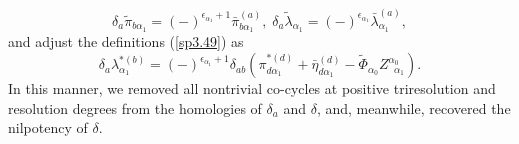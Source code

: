 \documentclass[a4paper,12pt]{article}
\begin{document}
\begin{equation}
\delta _{a}\tilde{\pi}_{b\alpha _{1}}=\left( -\right) ^{\epsilon _{\alpha
_{1}}+1}\bar{\pi}_{b\alpha _{1}}^{(a)},\;\delta _{a}\tilde{\lambda}_{\alpha
_{1}}=\left( -\right) ^{\epsilon _{\alpha _{1}}}\bar{\lambda}_{\alpha
_{1}}^{(a)},  \label{sp3.57}
\end{equation}
and adjust the definitions (\ref{sp3.49}) as 
\begin{equation}
\delta _{a}\lambda _{\alpha _{1}}^{*(b)}=\left( -\right) ^{\epsilon _{\alpha
_{1}}+1}\delta _{ab}\left( \pi _{d\alpha _{1}}^{*(d)}+\bar{\eta}_{d\alpha
_{1}}^{(d)}-\tilde{\Phi}_{\alpha _{0}}Z_{\;\;\alpha _{1}}^{\alpha
_{0}}\right) .  \label{sp3.58}
\end{equation}
In this manner, we removed all nontrivial co-cycles at positive
triresolution and resolution degrees from the homologies of $\delta _{a}$
and $\delta $, and, meanwhile, recovered the nilpotency of $\delta $.
\end{document}
